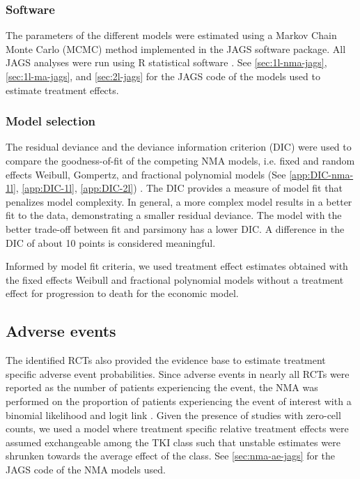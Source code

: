\documentclass[11pt,final,fleqn]{article}\usepackage[]{graphicx}\usepackage[]{color}
\theoremstyle{plain}
\newcommand\R{{\textsf{R}}}
\begin{document}
{\subsubsection{Software}
The parameters of the different models were estimated using a Markov Chain Monte Carlo (MCMC) method implemented in the JAGS software package. All JAGS analyses were run using \R{} statistical software \citep{team2014r}. See \autoref{sec:1l-nma-jags}, \autoref{sec:1l-ma-jags}, and \autoref{sec:2l-jags} for the JAGS code of the models used to estimate treatment effects.

\subsubsection{Model selection}\label{subsubsec:DIC}
The residual deviance and the deviance information criterion (DIC) were used to compare the goodness-of-fit of the competing NMA models, i.e. fixed and random effects Weibull, Gompertz, and fractional polynomial models (See \autoref{app:DIC-nma-1l}, \autoref{app:DIC-1l}, \autoref{app:DIC-2l}) \citep{dias2018network}. The DIC provides a measure of model fit that penalizes model complexity. In general, a more complex model results in a better fit to the data, demonstrating a smaller residual deviance. The model with the better trade-off between fit and parsimony has a lower DIC. A difference in the DIC of about 10 points is considered meaningful. 

Informed by model fit criteria, we used treatment effect estimates obtained with the fixed effects Weibull and fractional polynomial models without a treatment effect for progression to death for the economic model. 


\subsection{Adverse events}\label{subsec:data-aes}
The identified RCTs also provided the evidence base to estimate treatment specific adverse event probabilities. Since adverse events in nearly all RCTs were reported as the number of patients experiencing the event, the NMA was performed on the proportion of patients experiencing the event of interest with a binomial likelihood and logit link \citep[Chapter~2]{dias2018network}. Given the presence of studies with zero-cell counts, we used a model where treatment specific relative treatment effects were assumed exchangeable among the TKI class such that unstable estimates were shrunken towards the average effect of the class. See \autoref{sec:nma-ae-jags} for the JAGS code of the NMA models used.

}
\end{document}
